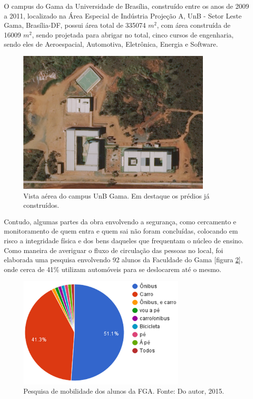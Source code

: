 O campus do Gama da Universidade de Brasília, construído entre os anos de 2009 a 2011, localizado na Área Especial de Indústria Projeção A, UnB - Setor Leste Gama, Brasília-DF, possui área total de 335074 $m^2$, com área construída de 16009 $m^2$, sendo projetada para abrigar no total, cinco cursos de engenharia, sendo eles de Aeroespacial, Automotiva, Eletrônica, Energia e Software.

\begin{figure}[H]
  \centering
  \includegraphics[width=0.87\textwidth]{figuras/fga1}
  \caption{Vista aérea do campus UnB Gama. Em destaque os prédios já construídos.}
  \label{img:fga1}
\end{figure}

Contudo, algumas partes da obra envolvendo a segurança, como cercamento e monitoramento de quem entra e quem sai não foram concluídas, colocando em risco a integridade física e dos bens daqueles que frequentam o núcleo de ensino. Como maneira de averiguar o fluxo de circulação das pessoas no local, foi elaborada uma pesquisa envolvendo  92 alunos da Faculdade do Gama [figura \ref{img:pesquisa}], onde cerca de 41\%  utilizam automóveis para se deslocarem até o mesmo.

\begin{figure}[H]
  \centering
  \includegraphics[width=0.75\textwidth]{figuras/pesquisa}
  \caption{Pesquisa de mobilidade dos alunos da FGA. Fonte: Do autor, 2015.}
  \label{img:pesquisa}
\end{figure}

